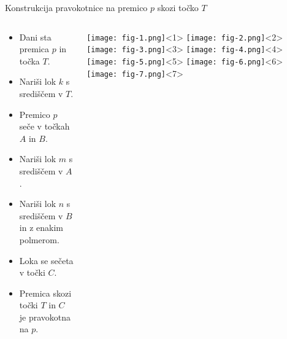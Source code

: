 \graphicspath{{C:/Users/Kanis/FMF/RP/racunalniski-praktikum/08-prosojnice/slike/}} %
\begin{frame}{Konstrukcija pravokotnice na premico $p$ skozi točko $T$}
	\begin{columns}
		\begin{column}{0.55\textwidth}
			\begin{itemize}[<+->]
				\item Dani sta premica $p$ in točka $T$.
				\item Nariši lok $k$ s središčem v $T$.
				\item Premico $p$ seče v točkah $A$ in $B$.
				\item Nariši lok $m$ s središčem v $A$.
				\item Nariši lok $n$ s središčem v $B$ in z enakim polmerom.
				\item Loka se sečeta v točki $C$.
				\item Premica skozi točki $T$ in $C$ je pravokotna na $p$.
			\end{itemize}
		\end{column}
		\begin{column}{0.45\textwidth}
			\centering
			\texttt{[image: fig-1.png]}<1>
	        \texttt{[image: fig-2.png]}<2>
	        \texttt{[image: fig-3.png]}<3>
	        \texttt{[image: fig-4.png]}<4>
	        \texttt{[image: fig-5.png]}<5>
	        \texttt{[image: fig-6.png]}<6>
	        \texttt{[image: fig-7.png]}<7>
		\end{column}
	\end{columns}
\end{frame}

